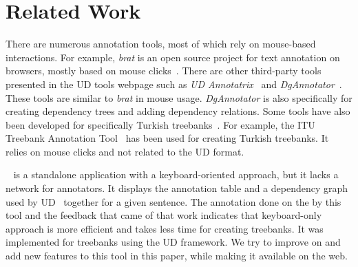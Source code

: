 \section{Related Work}
\label{sec:related}

There are numerous annotation tools, most of which rely on mouse-based interactions.
For example, \textit{brat} is an open source project for text annotation on browsers, mostly based on mouse clicks~\cite{brat,UD}.
There are other third-party tools presented in the UD tools webpage such as \textit{UD Annotatrix}~\cite{tyers-etal:2018} and \textit{DgAnnotator}~\cite{dgannotator}.
These tools are similar to \textit{brat} in mouse usage.
\textit{DgAnnotator} is also specifically for creating dependency trees and adding dependency relations.
Some tools have also been developed for specifically Turkish treebanks~\cite{turk-etal-2019-turkish}.
For example, the ITU Treebank Annotation Tool~\cite{pamay-etal-2015-annotation} has been used for creating Turkish treebanks.
It relies on mouse clicks and not related to the UD format.

\boatvone~\cite{turk-etal-2019-turkish} is a standalone application with a keyboard-oriented approach, but it lacks a network for annotators.
It displays the annotation table and a dependency graph used by UD~\cite{UD} together for a given sentence.
The annotation done on the \bountreebank{} by this tool and the feedback that came of that work indicates that keyboard-only approach is more efficient and takes less time for creating treebanks.
It was implemented for treebanks using the UD framework.
We try to improve on and add new features to this tool in this paper, while making it available on the web.
